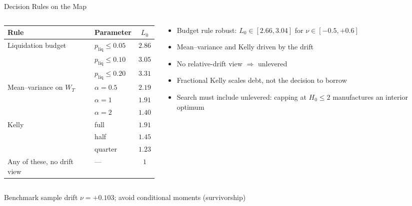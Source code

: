 \documentclass[aspectratio=169,10pt]{beamer}
\newcommand{\liq}{p_{\mathrm{liq}}}
\begin{document}
\begin{frame}{Decision Rules on the Map}
  \scriptsize
  \begin{columns}[T]
    \begin{column}{0.5\linewidth}
      \begin{tabular}{llc}
      \toprule
      Rule & Parameter & $L_0$ \\
      \midrule
      Liquidation budget & $\liq\le0.05$ & $2.86$ \\
       & $\liq\le0.10$ & $3.05$ \\
       & $\liq\le0.20$ & $3.31$ \\
      \midrule
      Mean--variance on $W_T$ & $\alpha=0.5$ & $2.19$ \\
       & $\alpha=1$ & $1.91$ \\
       & $\alpha=2$ & $1.40$ \\
      Kelly & full & $1.91$ \\
       & half & $1.45$ \\
       & quarter & $1.23$ \\
      \midrule
      Any of these, no drift view & --- & $1$ \\
      \bottomrule
      \end{tabular}
    \end{column}
    \begin{column}{0.48\linewidth}
      \small
      \begin{itemize}
        \item Budget rule robust: $L_0\in[2.66,3.04]$ for $\nu\in[-0.5,+0.6]$
        \item Mean--variance and Kelly driven by the drift
        \item No relative-drift view $\Rightarrow$ \alert{unlevered}
        \item Fractional Kelly scales debt, not the decision to borrow
        \item Search must include unlevered: capping at $H_0\le2$ manufactures an interior optimum
      \end{itemize}
    \end{column}
  \end{columns}
  \vspace{0.3em}
  Benchmark sample drift $\nu=+0.103$; avoid conditional moments (survivorship)
\end{frame}
\end{document}
